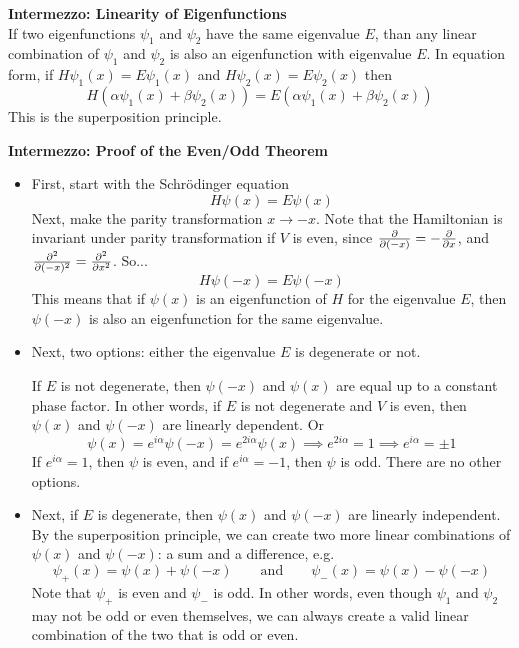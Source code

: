\documentclass[11pt, a4paper]{article}
\newcommand{\eqtext}[1]{\qquad \text{#1} \qquad}
\newcommand{\schro}{Schr\"{o}dinger\xspace}
\begin{document}
\textbf{Intermezzo: Linearity of Eigenfunctions}\\
If two eigenfunctions $ \psi_{1} $ and $ \psi_{2} $ have the same eigenvalue $ E $, than any linear combination of $ \psi_{1} $ and $ \psi_{2} $ is also an eigenfunction with eigenvalue $ E $. In equation form, if $ H\psi_{1}(x) = E \psi_{1}(x) $ and $ H\psi_{2}(x) = E \psi_{2}(x) $ then
\begin{equation*}
	H\left(\alpha \psi_{1}(x) + \beta \psi_{2}(x)\right) = E \left(\alpha \psi_{1}(x) + \beta \psi_{2}(x)\right)
\end{equation*}
This is the superposition principle. 


\textbf{Intermezzo: Proof of the Even/Odd Theorem}
\begin{itemize}
	\item First, start with the \schro equation
	\begin{equation*}
		H\psi(x) = E \psi(x)
	\end{equation*}
	Next, make the parity transformation $ x \to -x $. Note that the Hamiltonian is invariant under parity transformation if $ V $ is even, since $ \pdv{}{(-x)} = - \pdv{}{x} $, and $ \pdv[2]{}{(-x)} = \pdv[2]{}{x} $. So...
	\begin{equation*}
		H\psi(-x) = E\psi(-x)
	\end{equation*}
	This means that if $ \psi(x) $ is an eigenfunction of $ H $ for the eigenvalue $ E $, then $ \psi(-x) $ is also an eigenfunction for the same eigenvalue.
	
	\item Next, two options: either the eigenvalue $ E $ is degenerate or not.
	
	If $ E $ is not degenerate, then $ \psi(-x) $ and  $\psi(x) $ are equal up to a constant phase factor. In other words, if $ E $ is not degenerate and $ V $ is even, then $ \psi(x) $ and $ \psi(-x) $ are linearly dependent. Or
	\begin{equation*}
		 \psi(x) = e^{i\alpha}\psi(-x) = e^{2i\alpha}\psi(x) \implies e^{2i\alpha} = 1 \implies e^{i\alpha} = \pm 1
	\end{equation*}
	If $ e^{i\alpha} = 1 $, then $ \psi $ is even, and if $ e^{i\alpha} = - 1 $, then $ \psi $ is odd. There are no other options.
	
	\item Next, if $ E $ is degenerate, then $ \psi(x) $ and $ \psi(-x) $ are linearly independent. By the superposition principle, we can create two more linear combinations of $ \psi(x) $ and $ \psi(-x) $: a sum and a difference, e.g.
	\begin{equation*}
		\psi_{+}(x) = \psi(x) + \psi(-x) \eqtext{and} \psi_{-}(x) = \psi(x) - \psi(-x) 
	\end{equation*}
	Note that $ \psi_{+} $ is even and $ \psi_{-} $ is odd. In other words, even though $ \psi_{1} $ and $ \psi_{2} $ may not be odd or even themselves, we can always create a valid linear combination of the two that is odd or even.
	

\end{itemize}
\end{document}
